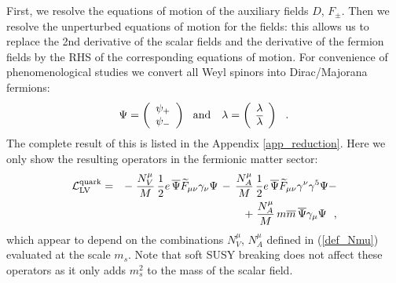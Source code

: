 \documentclass[12pt]{revtex4}
\begin{document}
First, we resolve the equations of motion of the auxiliary
fields $ D $, $ F_\pm $. 
Then we resolve the unperturbed equations of motion for the
fields: this allows us to replace the 2nd derivative of
the scalar fields and the derivative of the fermion fields
by the RHS of the corresponding equations of motion.
For convenience of phenomenological studies we convert
all Weyl spinors into Dirac/Majorana fermions:
\begin{equation}
\label{Dirac_spinors}
   \Psi = \left ( 
                 \begin{array}{c}
                    \psi_+ \\
                    \psi_-
                 \end{array}
          \right ) ~~  {\rm and} ~~~ 
   \lambda = \left (
                 \begin{array}{c}
                    \lambda \\
                    \overline{\lambda}
                 \end{array}
             \right ) ~~.
\end{equation}
The complete result of this is listed in the Appendix 
\ref{app_reduction}.
        Here we only show the resulting operators in the 
fermionic matter sector:
\begin{eqnarray}
\nonumber
   \mathcal{L}_{\rm LV}^{\rm quark} & = &
	-\;
       \frac{N_V^\mu}
              {M} \, \frac{1}{2}e \,
       \overline{\Psi} \widetilde{F}_{\mu\nu}
                       \gamma_\nu \Psi 
     \,-\, 
	\frac{N_A^\mu}
              {M} \, \frac{1}{2}e \,
       \overline{\Psi} \widetilde{F}_{\mu\nu}
                       \gamma^\nu \gamma^5 \Psi - \\
\label{resolved_LV_Dirac}
     && +\;  \frac{N_A^\mu}
                  {M}   \,m \overline{m}\, \overline{\Psi} \gamma_\mu \Psi
     ~~,
\end{eqnarray}
which appear to depend on the combinations 
$ N_V^\mu $, $ N_A^\mu $
defined in (\ref{def_Nmu}) 
evaluated at the 
scale $ m_{s} $.
Note that soft SUSY breaking does not affect these operators
as it only adds $ m_{s}^2 $ to the mass of the scalar field.
\end{document}
